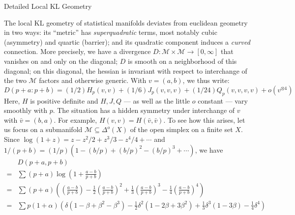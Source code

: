 \documentclass[12pt]{article}
\newcommand{\Mm}{\mathcal{M}}
\theoremstyle{definition}
\begin{document}
{
    \centering \Huge \sf \color{mblu} 
    Detailed Local KL Geometry
    \vspace{0.5cm}
}


    The local KL geometry of statistical manifolds deviates from euclidean
    geometry in two ways: its ``metric'' has \emph{superquadratic} terms,
    most notably cubic (asymmetry) and quartic (barrier); and its quadratic
    component induces a \emph{curved} connection.
    More precisely, we have a divergence $D:\Mm\times \Mm \to [0,\infty]$ 
    that vanishes on and only on the diagonal; $D$ is smooth on a neighborhood
    of this diagonal; on this diagonal, the hessian is invariant with respect
    to interchange of the two $\Mm$ factors and otherwise generic.
    With $v=(a,b)$, we thus write:
    $$
        D(p+a:p+b) = (1/2)H_p(v,v) + (1/6)J_p(v,v,v) + (1/24)Q_p(v,v,v,v) 
                     + o(v^{\otimes 4})
    $$
    Here, $H$ is positive definite and $H,J,Q$ --- as well as the little $o$
    constant --- vary smoothly with $p$. 
    The situation has a hidden symmetry under interchange of $v$ with $\bar v =
    (b,a)$.  For example, $H(v,v) = H(\bar v, \bar v)$. 
    To see how this arises, let us focus on a submanifold $\Mm \subseteq
    \Delta^o(X)$ of the open simplex on a finite set $X$.  Since $\log(1+z) =
    z-z^2/2+z^3/3-z^4/4+\cdots$ and
    $1/(p+b) = (1/p)(1-(b/p)+(b/p)^2-(b/p)^3+\cdots)$,
    we have
    \begin{align*}
          &D(p+a, p+b) \\
        = &\sum (p+a) \log\left(1 + \frac{a-b}{p + b}\right)\\ 
        = &\sum (p+a) \left(
                        \left(\frac{a-b}{p + b}\right)
            -\frac{1}{2}\left(\frac{a-b}{p + b}\right)^2
            +\frac{1}{3}\left(\frac{a-b}{p + b}\right)^3
            -\frac{1}{4}\left(\frac{a-b}{p + b}\right)^4
        \right)\\
        = &\sum p(1+\alpha) \left(
                        \delta   (1 -\beta + \beta^2 - \beta^3)
            -\frac{1}{2}\delta^2 (1 -2\beta + 3\beta^2)
            +\frac{1}{3}\delta^3 (1 -3\beta)
            -\frac{1}{4}\delta^4 
        \right)
    \end{align*}
\end{document}
